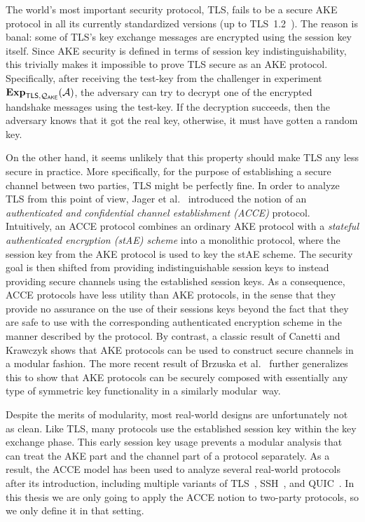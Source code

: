 The world's most important security protocol,
TLS,
fails to be a secure AKE protocol in all its currently standardized versions 
(up to TLS~1.2~\cite{IETF:RFC5246:TLS}).
The reason is banal:
some of TLS's key exchange messages are encrypted using the session key itself.
Since AKE security is defined in terms of session key indistinguishability,
this trivially makes it impossible to prove TLS secure as an AKE protocol.
Specifically,
after receiving the test-key from the challenger in experiment $\mathbf{Exp}_{\mathsf{TLS},\mathcal{Q}_{\mathsf{AKE}}}(\mathcal{A})$,
the adversary can try to decrypt one of the encrypted handshake messages using the test-key.
If the decryption succeeds,
then the adversary knows that it got the real key,
otherwise, it must have gotten a random key.

On the other hand,
it seems unlikely that this property should make TLS any less secure in practice.
More specifically,
for the purpose of establishing a secure channel between two parties,
TLS might be perfectly fine. 
In order to analyze TLS from this point of view,
Jager et al.~\cite{C:JKSS12} introduced the notion of an  \emph{authenticated and confidential channel establishment (ACCE)} protocol.
Intuitively,
an ACCE protocol combines an ordinary AKE protocol with a \emph{stateful authenticated encryption (stAE) scheme} into a monolithic protocol,
where the session key from the AKE protocol is used to key the stAE scheme.  
The security goal is then shifted from providing indistinguishable session keys to instead providing secure channels using the established session keys. 
As a consequence, ACCE protocols have less utility than AKE protocols,
in the sense that they provide no assurance on the use of their sessions keys beyond the fact that they are safe to use with the corresponding authenticated encryption scheme in the manner described by the protocol.
By contrast,
a classic result of Canetti and Krawczyk \cite{EC:CanKra01} shows that AKE protocols can be used to construct secure channels in a modular fashion.
The more recent result of Brzuska et al.~\cite{CCS:BFWW11} further generalizes this to show that AKE protocols can be securely composed with essentially any type of symmetric key functionality in a similarly modular~way.


Despite the merits of modularity, most real-world designs are unfortunately not as clean.  
Like TLS,
many protocols use the established session key within the key exchange phase.
This early session key usage prevents a modular analysis that can treat the AKE part and the channel part of a protocol separately.
As a result,
the ACCE model has been used to analyze several real-world protocols after its introduction,
including multiple variants of TLS~\cite{C:JKSS12,C:KraPatWee13,EPRINT:KohSchSch13,PKC:LSYKS14},
SSH~\cite{CCS:BDKSS14},
and QUIC~\cite{SP:LJBN15}.
In this thesis we are only going to apply the ACCE notion to two-party protocols,
so we only define it in that setting.

